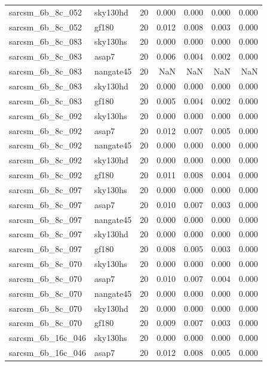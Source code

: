 \begin{tabular}{llrrrrr}
sarcsm\_6b\_8c\_052 & sky130hd & 20 & 0.000 & 0.000 & 0.000 & 0.000 \\
sarcsm\_6b\_8c\_052 & gf180 & 20 & 0.012 & 0.008 & 0.003 & 0.000 \\
sarcsm\_6b\_8c\_083 & sky130hs & 20 & 0.000 & 0.000 & 0.000 & 0.000 \\
sarcsm\_6b\_8c\_083 & asap7 & 20 & 0.006 & 0.004 & 0.002 & 0.000 \\
sarcsm\_6b\_8c\_083 & nangate45 & 20 & NaN & NaN & NaN & NaN \\
sarcsm\_6b\_8c\_083 & sky130hd & 20 & 0.000 & 0.000 & 0.000 & 0.000 \\
sarcsm\_6b\_8c\_083 & gf180 & 20 & 0.005 & 0.004 & 0.002 & 0.000 \\
sarcsm\_6b\_8c\_092 & sky130hs & 20 & 0.000 & 0.000 & 0.000 & 0.000 \\
sarcsm\_6b\_8c\_092 & asap7 & 20 & 0.012 & 0.007 & 0.005 & 0.000 \\
sarcsm\_6b\_8c\_092 & nangate45 & 20 & 0.000 & 0.000 & 0.000 & 0.000 \\
sarcsm\_6b\_8c\_092 & sky130hd & 20 & 0.000 & 0.000 & 0.000 & 0.000 \\
sarcsm\_6b\_8c\_092 & gf180 & 20 & 0.011 & 0.008 & 0.004 & 0.000 \\
sarcsm\_6b\_8c\_097 & sky130hs & 20 & 0.000 & 0.000 & 0.000 & 0.000 \\
sarcsm\_6b\_8c\_097 & asap7 & 20 & 0.010 & 0.007 & 0.003 & 0.000 \\
sarcsm\_6b\_8c\_097 & nangate45 & 20 & 0.000 & 0.000 & 0.000 & 0.000 \\
sarcsm\_6b\_8c\_097 & sky130hd & 20 & 0.000 & 0.000 & 0.000 & 0.000 \\
sarcsm\_6b\_8c\_097 & gf180 & 20 & 0.008 & 0.005 & 0.003 & 0.000 \\
sarcsm\_6b\_8c\_070 & sky130hs & 20 & 0.000 & 0.000 & 0.000 & 0.000 \\
sarcsm\_6b\_8c\_070 & asap7 & 20 & 0.010 & 0.007 & 0.004 & 0.000 \\
sarcsm\_6b\_8c\_070 & nangate45 & 20 & 0.000 & 0.000 & 0.000 & 0.000 \\
sarcsm\_6b\_8c\_070 & sky130hd & 20 & 0.000 & 0.000 & 0.000 & 0.000 \\
sarcsm\_6b\_8c\_070 & gf180 & 20 & 0.009 & 0.007 & 0.003 & 0.000 \\
sarcsm\_6b\_16c\_046 & sky130hs & 20 & 0.000 & 0.000 & 0.000 & 0.000 \\
sarcsm\_6b\_16c\_046 & asap7 & 20 & 0.012 & 0.008 & 0.005 & 0.000 \\

\end{tabular}
